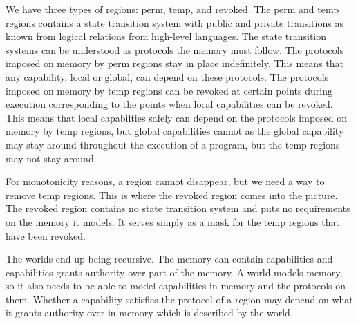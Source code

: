 \documentclass[compsoc,conference,letterpaper,fleqn]{IEEEtran}
\newcommand{\plainperm}[1]{\mathrm{#1}}
\newcommand{\local}{\plainperm{local}}
\newcommand{\glob}{\plainperm{global}}
\newcommand{\plainview}[1]{\mathrm{#1}}
\newcommand{\perma}{\plainview{perm}}
\newcommand{\temp}{\plainview{temp}}
\newcommand{\revoked}{\plainview{revoked}}
\begin{document}
We have three types of regions: $\perma$, $\temp$, and $\revoked$. The
$\perma$ and $\temp$ regions contains a state transition system with
public and private transitions as known from logical relations
from high-level languages. The state transition
systems can be understood as protocols the memory must follow. The
protocols imposed on memory by $\perma$ regions stay in place
indefinitely. This means that any capability, $\local$ or $\glob$, can
depend on these protocols. The protocols imposed on memory by $\temp$
regions can be revoked at certain points during execution
corresponding to the points when $\local$ capabilities can be
revoked. This means that $\local$ capabilties safely can depend on the
protocols imposed on memory by $\temp$ regions, but $\glob$
capabilities cannot as the $\glob$ capability may stay around
throughout the execution of a program, but the $\temp$ regions may not
stay around. 

For monotonicity reasons, a region cannot disappear, but
we need a way to remove $\temp$ regions. This is where the $\revoked$ region comes
into the picture. The $\revoked$ region contains no state transition
system and puts no requirements on the memory it models. It serves
simply as a mask for the $\temp$ regions that have been revoked.

The worlds end up being recursive. The memory can contain capabilities
and capabilities grants authority over part of the memory. A world
models memory, so it also needs to be able to model capabilities in
memory and the protocols on them. Whether a capability satisfies the
protocol of a region may depend on what it grants authority over in
memory which is described by the world.
\end{document}
